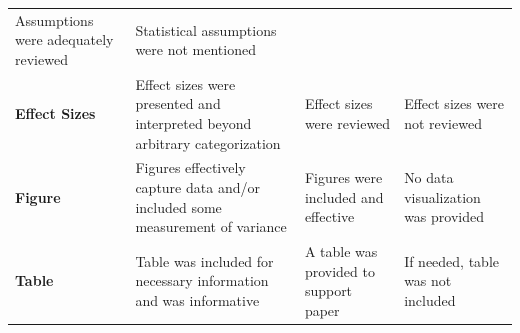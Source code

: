 \documentclass[
  openany]{book}
\begin{document}
\begin{longtable}[]{@{}llll@{}}
\begin{minipage}[t]{0.22\columnwidth}
Assumptions were adequately reviewed\strut
\end{minipage} & \begin{minipage}[t]{0.22\columnwidth}\raggedright
Statistical assumptions were not mentioned\strut
\end{minipage}\tabularnewline
\begin{minipage}[t]{0.22\columnwidth}\raggedright
\textbf{Effect Sizes}\strut
\end{minipage} & \begin{minipage}[t]{0.22\columnwidth}\raggedright
Effect sizes were presented and interpreted beyond arbitrary categorization\strut
\end{minipage} & \begin{minipage}[t]{0.22\columnwidth}\raggedright
Effect sizes were reviewed\strut
\end{minipage} & \begin{minipage}[t]{0.22\columnwidth}\raggedright
Effect sizes were not reviewed\strut
\end{minipage}\tabularnewline
\begin{minipage}[t]{0.22\columnwidth}\raggedright
\textbf{Figure}\strut
\end{minipage} & \begin{minipage}[t]{0.22\columnwidth}\raggedright
Figures effectively capture data and/or included some measurement of variance\strut
\end{minipage} & \begin{minipage}[t]{0.22\columnwidth}\raggedright
Figures were included and effective\strut
\end{minipage} & \begin{minipage}[t]{0.22\columnwidth}\raggedright
No data visualization was provided\strut
\end{minipage}\tabularnewline
\begin{minipage}[t]{0.22\columnwidth}\raggedright
\textbf{Table}\strut
\end{minipage} & \begin{minipage}[t]{0.22\columnwidth}\raggedright
Table was included for necessary information and was informative\strut
\end{minipage} & \begin{minipage}[t]{0.22\columnwidth}\raggedright
A table was provided to support paper\strut
\end{minipage} & \begin{minipage}[t]{0.22\columnwidth}\raggedright
If needed, table was not included\strut
\end{minipage}\tabularnewline

\end{longtable}
\end{document}

